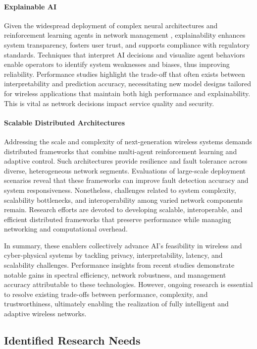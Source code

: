 \documentclass[sigconf]{acmart}
\begin{document}
\paragraph{Explainable AI} Given the widespread deployment of complex neural architectures and reinforcement learning agents in network management \cite{ref50}, explainability enhances system transparency, fosters user trust, and supports compliance with regulatory standards. Techniques that interpret AI decisions and visualize agent behaviors enable operators to identify system weaknesses and biases, thus improving reliability. Performance studies highlight the trade-off that often exists between interpretability and prediction accuracy, necessitating new model designs tailored for wireless applications that maintain both high performance and explainability. This is vital as network decisions impact service quality and security.

\paragraph{Scalable Distributed Architectures} Addressing the scale and complexity of next-generation wireless systems demands distributed frameworks that combine multi-agent reinforcement learning and adaptive control. Such architectures provide resilience and fault tolerance across diverse, heterogeneous network segments. Evaluations of large-scale deployment scenarios reveal that these frameworks can improve fault detection accuracy and system responsiveness. Nonetheless, challenges related to system complexity, scalability bottlenecks, and interoperability among varied network components remain. Research efforts are devoted to developing scalable, interoperable, and efficient distributed frameworks that preserve performance while managing networking and computational overhead.

In summary, these enablers collectively advance AI's feasibility in wireless and cyber-physical systems by tackling privacy, interpretability, latency, and scalability challenges. Performance insights from recent studies demonstrate notable gains in spectral efficiency, network robustness, and management accuracy attributable to these technologies. However, ongoing research is essential to resolve existing trade-offs between performance, complexity, and trustworthiness, ultimately enabling the realization of fully intelligent and adaptive wireless networks.

\subsection{Identified Research Needs}
\end{document}
